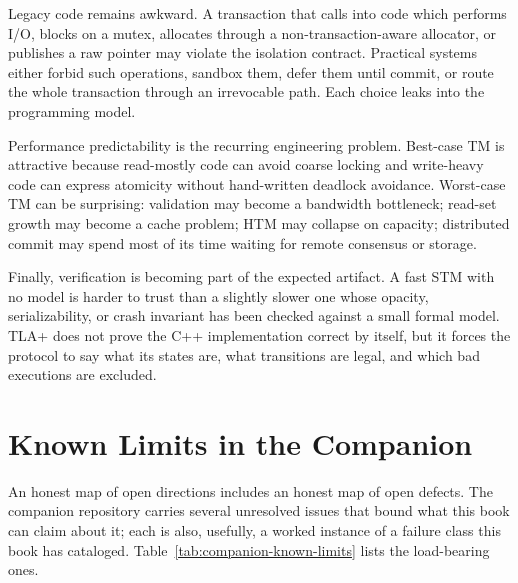 Legacy code remains awkward. A transaction that calls into code which performs I/O, blocks on a mutex, allocates through a non-transaction-aware allocator, or publishes a raw pointer may violate the isolation contract. Practical systems either forbid such operations, sandbox them, defer them until commit, or route the whole transaction through an irrevocable path. Each choice leaks into the programming model.

Performance predictability is the recurring engineering problem. Best-case TM is attractive because read-mostly code can avoid coarse locking and write-heavy code can express atomicity without hand-written deadlock avoidance. Worst-case TM can be surprising: validation may become a bandwidth bottleneck; read-set growth may become a cache problem; HTM may collapse on capacity; distributed commit may spend most of its time waiting for remote consensus or storage.

Finally, verification is becoming part of the expected artifact. A fast STM with no model is harder to trust than a slightly slower one whose opacity, serializability, or crash invariant has been checked against a small formal model. TLA+ does not prove the C++ implementation correct by itself, but it forces the protocol to say what its states are, what transitions are legal, and which bad executions are excluded.

\section{Known Limits in the Companion}

An honest map of open directions includes an honest map of open defects. The
companion repository carries several unresolved issues that bound what this
book can claim about it; each is also, usefully, a worked instance of a
failure class this book has cataloged. Table~\ref{tab:companion-known-limits}
lists the load-bearing ones.

